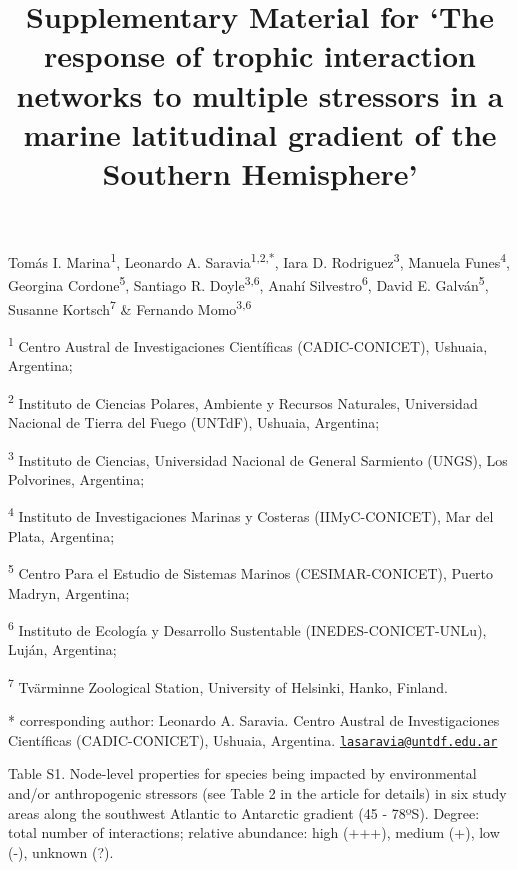 \documentclass[
]{article}
\title{Supplementary Material for `The response of trophic interaction
networks to multiple stressors in a marine latitudinal gradient of the
Southern Hemisphere'}
\author{}
\date{\vspace{-2.5em}}
\begin{document}
\maketitle

Tomás I. Marina\textsuperscript{1}, Leonardo A.
Saravia\textsuperscript{1,2,*}, Iara D. Rodriguez\textsuperscript{3},
Manuela Funes\textsuperscript{4}, Georgina Cordone\textsuperscript{5},
Santiago R. Doyle\textsuperscript{3,6}, Anahí
Silvestro\textsuperscript{6}, David E. Galván\textsuperscript{5},
Susanne Kortsch\textsuperscript{7} \& Fernando Momo\textsuperscript{3,6}

\textsuperscript{1} Centro Austral de Investigaciones Científicas
(CADIC-CONICET), Ushuaia, Argentina;

\textsuperscript{2} Instituto de Ciencias Polares, Ambiente y Recursos
Naturales, Universidad Nacional de Tierra del Fuego (UNTdF), Ushuaia,
Argentina;

\textsuperscript{3} Instituto de Ciencias, Universidad Nacional de
General Sarmiento (UNGS), Los Polvorines, Argentina;

\textsuperscript{4} Instituto de Investigaciones Marinas y Costeras
(IIMyC-CONICET), Mar del Plata, Argentina;

\textsuperscript{5} Centro Para el Estudio de Sistemas Marinos
(CESIMAR-CONICET), Puerto Madryn, Argentina;

\textsuperscript{6} Instituto de Ecología y Desarrollo Sustentable
(INEDES-CONICET-UNLu), Luján, Argentina;

\textsuperscript{7} Tvärminne Zoological Station, University of
Helsinki, Hanko, Finland.

* corresponding author: Leonardo A. Saravia. Centro Austral de
Investigaciones Científicas (CADIC-CONICET), Ushuaia, Argentina.
\href{mailto:lasaravia@untdf.edu.ar}{\nolinkurl{lasaravia@untdf.edu.ar}}

\newpage


Table S1. Node-level properties for species being impacted by
environmental and/or anthropogenic stressors (see Table 2 in the article
for details) in six study areas along the southwest Atlantic to
Antarctic gradient (45 - 78ºS). Degree: total number of interactions;
relative abundance: high (+++), medium (+), low (-), unknown (?).
\end{document}
